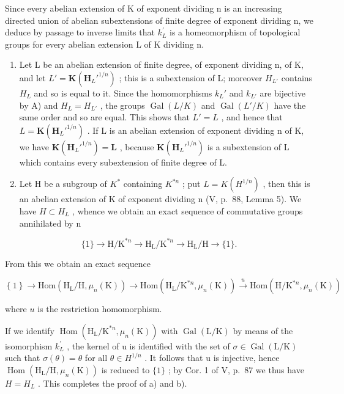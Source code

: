Since every abelian extension of K of exponent dividing n is an increasing directed union of abelian subextensions of finite degree of exponent dividing n, we deduce by passage to inverse limits that \(k_{L}^{\prime}\) is a homeomorphism of topological groups for every abelian extension L of K dividing n.

\begin{enumerate}
\def\labelenumi{\Alph{enumi})}
\setcounter{enumi}{1}
\item
  Let L be an abelian extension of finite degree, of exponent dividing n, of K, and let \(L' = \mathbf{K}(\mathbf{H}_{L}'^{1/n})\) ; this is a subextension of L; moreover \(H_{L'}\) contains \(H_{L}\) and so is equal to it. Since the homomorphisms \(k_{L}'\) and \(k_{L'}\) are bijective by A) and \(H_{L} = H_{L'}\) , the groups \(\operatorname{Gal}(L/K)\) and \(\operatorname{Gal}(L'/K)\) have the same order and so are equal. This shows that \(L' = L\) , and hence that \(L = \mathbf{K}(\mathbf{H}_{L}'^{1/n})\) . If L is an abelian extension of exponent dividing n of K, we have \(\mathbf{K}(\mathbf{H}_{L}'^{1/n}) = \mathbf{L}\) , because \(\mathbf{K}(\mathbf{H}_{L}'^{1/n})\) is a subextension of L which contains every subextension of finite degree of L.
\item
  Let H be a subgroup of \(K^{*}\) containing \(K^{*n}\) ; put \(L = K(H^{1/n})\) , then this is an abelian extension of K of exponent dividing n (V, p.~88, Lemma 5). We have \(H \subset H_{L}\) , whence we obtain an exact sequence of commutative groups annihilated by n
\end{enumerate}

\[
\{1 \} \rightarrow \mathrm{H} / \mathrm{K} ^ {* n} \rightarrow \mathrm{H} _ {\mathrm{L}} / \mathrm{K} ^ {* n} \rightarrow \mathrm{H} _ {\mathrm{L}} / \mathrm{H} \rightarrow \{1 \}.
\]

From this we obtain an exact sequence

\[
\left\{1 \right\}\rightarrow \mathrm{Hom} \left(\mathrm{H} _ {\mathrm{L}} / \mathrm{H}, \mu_ {n} (\mathrm{K})\right)\rightarrow \mathrm{Hom} \left(\mathrm{H} _ {\mathrm{L}} / \mathrm{K} ^ {* n}, \mu_ {n} (\mathrm{K})\right) \stackrel {u} {\rightarrow} \mathrm{Hom} \left(\mathrm{H} / \mathrm{K} ^ {* n}, \mu_ {n} (\mathrm{K})\right)
\]

where \(u\) is the restriction homomorphism.

If we identify \(\operatorname{Hom}(\mathrm{H}_{\mathrm{L}}/\mathrm{K}^{*n},\mu_{n}(\mathrm{K}))\) with \(\operatorname{Gal}(\mathrm{L}/\mathrm{K})\) by means of the isomorphism \(k_{L}^{\prime}\) , the kernel of u is identified with the set of \(\sigma\in\operatorname{Gal}(\mathrm{L}/\mathrm{K})\) such that \(\sigma(\theta)=\theta\) for all \(\theta\in H^{1/n}\) . It follows that u is injective, hence \(\operatorname{Hom}(\mathrm{H}_{\mathrm{L}}/\mathrm{H},\mu_{n}(\mathrm{K}))\) is reduced to \(\{1\}\) ; by Cor. 1 of V, p.~87 we thus have \(H=H_{L}\) . This completes the proof of a) and b).


